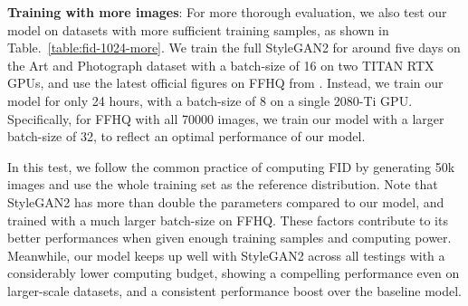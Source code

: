 \documentclass{article} \usepackage{iclr2021_conference,times}
\begin{document}
\begin{table}[h]
\vspace{-2mm}
\caption{FID comparison at  resolution on datasets with more images.}
\label{table:fid-1024-more}
\vspace{-2mm}
\begin{center}
\end{center}
\vspace{-0mm}

\end{table}

\textbf{Training with more images}: For more thorough evaluation, we also test our model on datasets with more sufficient training samples, as shown in Table.~\ref{table:fid-1024-more}. We train the full StyleGAN2 for around five days on the Art and Photograph dataset with a batch-size of 16 on two TITAN RTX GPUs, and use the latest official figures on FFHQ from \citeauthor{zhao2020differentiable}. Instead, we train our model for only 24 hours, with a batch-size of 8 on a single 2080-Ti GPU. Specifically, for FFHQ with all 70000 images, we train our model with a larger batch-size of 32, to reflect an optimal performance of our model. 

In this test, we follow the common practice of computing FID by generating 50k images and use the whole training set as the reference distribution. Note that StyleGAN2 has more than double the parameters compared to our model, and trained with a much larger batch-size on FFHQ. These factors contribute to its better performances when given enough training samples and computing power. Meanwhile, our model keeps up well with StyleGAN2 across all testings with a considerably lower computing budget, showing a compelling performance even on larger-scale datasets, and a consistent performance boost over the baseline model.
\end{document}
